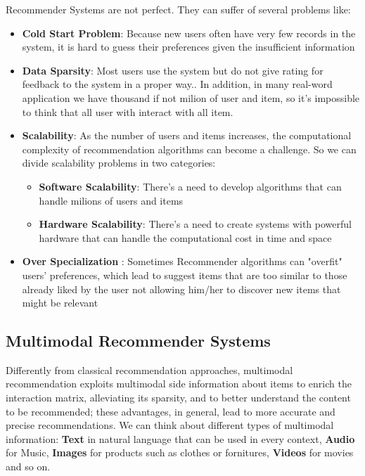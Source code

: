 Recommender Systems are not perfect. They can suffer of several problems like:
\begin{itemize}
    \item \textbf{Cold Start Problem}: Because new users often have very few records in the system, it is hard to guess their preferences given the insufficient information\cite{ColdStart}
    \item \textbf{Data Sparsity}: Most users use the system but do not give rating for feedback to the system in a proper way.\cite{Sparsity}. In addition, in many real-word application we have thousand if not milion of user and item, so it's impossible to think that all user with interact with all item.
    \item \textbf{Scalability}: As the number of users and items increases, the computational complexity of recommendation algorithms can become a challenge. So we can divide scalability problems in two categories: 
    \begin{itemize}
        \item \textbf{Software Scalability}: There's a need to develop algorithms that can handle milions of users and items
        \item \textbf{Hardware Scalability}: There's a need to create systems with powerful hardware that can handle the computational cost in time and space
    \end{itemize}
    \item \textbf{Over Specialization }: Sometimes Recommender algorithms can "overfit" users' preferences, which lead to suggest items that are too similar to those already liked by the user not allowing him/her to discover new items that might be relevant
\end{itemize}


\subsection{Multimodal Recommender Systems}
Differently from classical recommendation approaches, multimodal recommendation exploits multimodal side information about items to enrich the interaction matrix, alleviating its sparsity, and to better understand the content to be recommended; these advantages, in general, lead to more accurate and precise recommendations\cite{Spillong}. We can think about different types of multimodal information: \textbf{Text} in natural language that can be used in every context, \textbf{Audio} for Music, \textbf{Images} for products such as clothes or fornitures, \textbf{Videos} for movies and so on.


